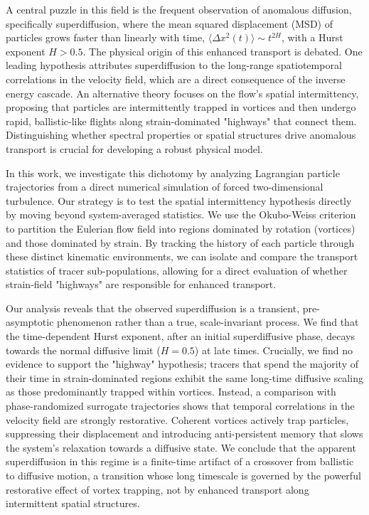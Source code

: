 \documentclass[]{article}
\begin{document}
A central puzzle in this field is the frequent observation of anomalous diffusion, specifically superdiffusion, where the mean squared displacement (MSD) of particles grows faster than linearly with time, $\langle \Delta x^2(t) \rangle \sim t^{2H}$, with a Hurst exponent $H > 0.5$. The physical origin of this enhanced transport is debated. One leading hypothesis attributes superdiffusion to the long-range spatiotemporal correlations in the velocity field, which are a direct consequence of the inverse energy cascade. An alternative theory focuses on the flow's spatial intermittency, proposing that particles are intermittently trapped in vortices and then undergo rapid, ballistic-like flights along strain-dominated "highways" that connect them. Distinguishing whether spectral properties or spatial structures drive anomalous transport is crucial for developing a robust physical model.

In this work, we investigate this dichotomy by analyzing Lagrangian particle trajectories from a direct numerical simulation of forced two-dimensional turbulence. Our strategy is to test the spatial intermittency hypothesis directly by moving beyond system-averaged statistics. We use the Okubo-Weiss criterion to partition the Eulerian flow field into regions dominated by rotation (vortices) and those dominated by strain. By tracking the history of each particle through these distinct kinematic environments, we can isolate and compare the transport statistics of tracer sub-populations, allowing for a direct evaluation of whether strain-field "highways" are responsible for enhanced transport.

Our analysis reveals that the observed superdiffusion is a transient, pre-asymptotic phenomenon rather than a true, scale-invariant process. We find that the time-dependent Hurst exponent, after an initial superdiffusive phase, decays towards the normal diffusive limit ($H=0.5$) at late times. Crucially, we find no evidence to support the "highway" hypothesis; tracers that spend the majority of their time in strain-dominated regions exhibit the same long-time diffusive scaling as those predominantly trapped within vortices. Instead, a comparison with phase-randomized surrogate trajectories shows that temporal correlations in the velocity field are strongly restorative. Coherent vortices actively trap particles, suppressing their displacement and introducing anti-persistent memory that slows the system's relaxation towards a diffusive state. We conclude that the apparent superdiffusion in this regime is a finite-time artifact of a crossover from ballistic to diffusive motion, a transition whose long timescale is governed by the powerful restorative effect of vortex trapping, not by enhanced transport along intermittent spatial structures.
\end{document}
